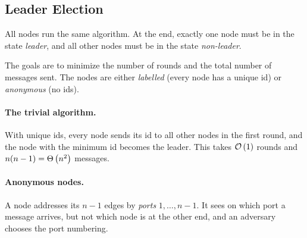 \subsection{Leader Election}

\begin{problem}
    All nodes run the same algorithm. At the end, exactly one node must be
    in the state \emph{leader}, and all other nodes must be in the state \emph{non-leader}.
\end{problem}

The goals are to minimize the number of rounds and the total number of messages sent. The nodes are
either \emph{labelled} (every node has a unique id) or \emph{anonymous} (no ids).

\paragraph{The trivial algorithm.} With unique ids, every node sends its id to all other nodes in the
first round, and the node with the minimum id becomes the leader. This takes $\mathcal{O}\left(1\right)$ rounds and
$n(n-1) = \Theta\left(n^2\right)$ messages.

\paragraph{Anonymous nodes.} A node addresses its $n - 1$ edges by \emph{ports} $1, \dots, n-1$.
It sees on which port a message arrives, but not which node is at the other end, and an adversary
chooses the port numbering.

